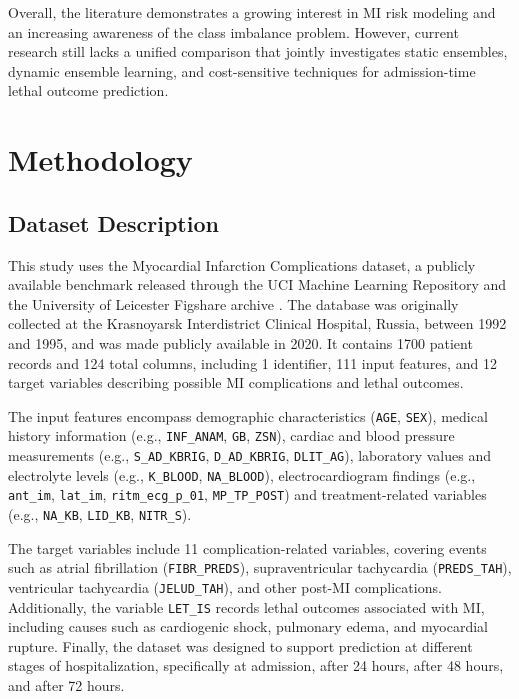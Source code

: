 \documentclass[conference]{IEEEtran}
\begin{document}
Overall, the literature demonstrates a growing interest in MI risk modeling and an increasing awareness of the class imbalance problem. However, current research still lacks a unified comparison that jointly investigates static ensembles, dynamic ensemble learning, and cost-sensitive techniques for admission-time lethal outcome prediction.

\section{Methodology} \label{sec:methodology}
\subsection{Dataset Description}
This study uses the Myocardial Infarction Complications dataset, a publicly available benchmark released through the UCI Machine Learning Repository and the University of Leicester Figshare archive \cite{golovenkin2020myocardial}. The database was originally collected at the Krasnoyarsk Interdistrict Clinical Hospital, Russia, between 1992 and 1995, and was made publicly available in 2020. It contains 1700 patient records and 124 total columns, including 1 identifier, 111 input features, and 12 target variables describing possible MI complications and lethal outcomes. 

The input features encompass demographic characteristics (\texttt{AGE}, \texttt{SEX}), medical history information (e.g., \texttt{INF\_ANAM}, \texttt{GB}, \texttt{ZSN}), cardiac and blood pressure measurements (e.g., \texttt{S\_AD\_KBRIG}, \texttt{D\_AD\_KBRIG}, \texttt{DLIT\_AG}), laboratory values and electrolyte levels (e.g., \texttt{K\_BLOOD}, \texttt{NA\_BLOOD}), electrocardiogram findings (e.g., \texttt{ant\_im}, \texttt{lat\_im}, \texttt{ritm\_ecg\_p\_01}, \texttt{MP\_TP\_POST}) and treatment-related variables (e.g., \texttt{NA\_KB}, \texttt{LID\_KB}, \texttt{NITR\_S}). 

The target variables include 11 complication-related variables, covering events such as atrial fibrillation (\texttt{FIBR\_PREDS}), supraventricular tachycardia (\texttt{PREDS\_TAH}), ventricular tachycardia (\texttt{JELUD\_TAH}), and other post-MI complications. Additionally, the variable \texttt{LET\_IS} records lethal outcomes associated with MI, including causes such as cardiogenic shock, pulmonary edema, and myocardial rupture. Finally, the dataset was designed to support prediction at different stages of hospitalization, specifically at admission, after 24 hours, after 48 hours, and after 72 hours.
\end{document}
